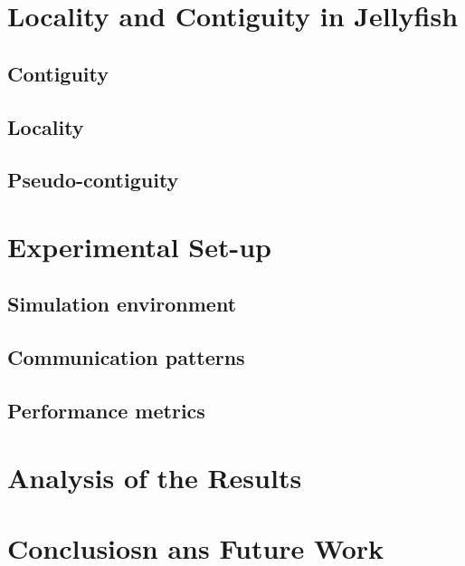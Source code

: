 \documentclass{sig-alternate}
\begin{document}
\section{Locality and Contiguity in Jellyfish}
\label{locality}


\subsection{Contiguity}
\label{contiguity}

\subsection{Locality}
\label{locality}

\subsection{Pseudo-contiguity}
\label{pseudocontiguity}





\section{Experimental Set-up}
\label{experimental}

\subsection{Simulation environment}
\label{subsec:simulation}


\subsection{Communication patterns}
\label{subsec:communication}

\subsection{Performance metrics}
\label{subsec:performance}


\section{Analysis of the Results}
\label{analysis}

\section{Conclusiosn ans Future Work}
\label{conclusions}




\end{document}
